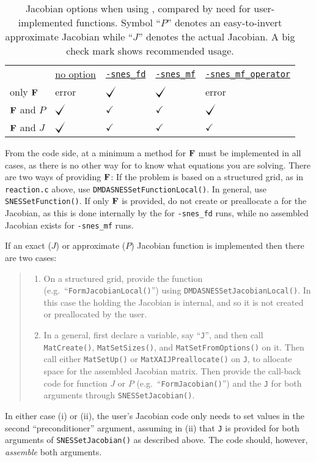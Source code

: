 \begin{table}
\begin{tabular}{lllll}
 &\underline{no option}\hspace{0.0in} & \underline{\texttt{-snes\_fd}} & \underline{\texttt{-snes\_mf}} & \underline{\texttt{-snes\_mf\_operator}} \\
only $\mathbf{F}$      & error           & $\bigcheckmark$ & $\bigcheckmark$ & error \\
$\mathbf{F}$ and $P$   & $\bigcheckmark$ & $\checkmark$    & $\checkmark$    & $\bigcheckmark$ \\
$\mathbf{F}$ and $J$   & $\bigcheckmark$ & $\checkmark$    & $\checkmark$    & $\checkmark$
\end{tabular}
\caption{Jacobian options when using \pSNES, compared by need for user-implemented functions.  Symbol ``$P$'' denotes an easy-to-invert approximate Jacobian while ``$J$'' denotes the actual Jacobian.  A big check mark shows recommended usage.} \label{tab:snesjacobianoptions:needed}
\end{table}

From the code side, at a minimum a method for $\mathbf{F}$ must be implemented in all cases, as there is no other way for \PETSc to know what equations you are solving.  There are two ways of providing $\mathbf{F}$:  If the problem is based on a structured grid, as in \texttt{reaction.c} above, use \texttt{DMDASNESSetFunctionLocal()}.  In general, use \texttt{SNESSetFunction()}.  If only $\mathbf{F}$ is provided, do not create or preallocate a \pMat for the Jacobian, as this is done internally by the \pSNES for \texttt{-snes\_fd} runs, while no assembled Jacobian \pMat exists for \texttt{-snes\_mf} runs.

If an exact ($J$) or approximate ($P$) Jacobian function is implemented then there are two cases:
\begin{quote}
  \renewcommand{\labelenumi}{(\roman{enumi})}
  \begin{enumerate}
  \item On a structured grid, provide the function (e.g.~``\texttt{FormJacobianLocal()}'') using \texttt{DMDASNESSetJacobianLocal()}.  In this case the \pMat holding the Jacobian is internal, and so it is not created or preallocated by the user.
  \item In a general, first declare a \pMat variable, say ``\texttt{J}'', and then call \texttt{MatCreate()}, \texttt{MatSetSizes()}, and \texttt{MatSetFromOptions()} on it.  Then call either \texttt{MatSetUp()} or \texttt{MatXAIJPreallocate()} on \texttt{J}, to allocate space for the assembled Jacobian matrix.  Then provide the call-back code for function $J$ or $P$ (e.g.~``\texttt{FormJacobian()}'') and the \pMat \texttt{J} for both \pMat arguments through \texttt{SNESSetJacobian()}.
  \end{enumerate}
\end{quote}
In either case (i) or (ii), the user's Jacobian code only needs to set values in the second ``preconditioner'' \pMat argument, assuming in (ii) that \texttt{J} is provided for both \pMat arguments of   \texttt{SNESSetJacobian()} as described above.  The code should, however, \emph{assemble} both \pMat arguments.

